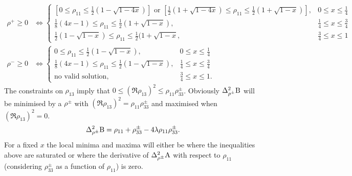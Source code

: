 \begin{align}
  \label{eqn:rho-plus-constraints}
  \rho^+ \geq 0 &\iff \begin{cases}\left[ 0\leq \rho_{11}\leq\frac{1}{2}(1-\sqrt{1-4x})\right] \text{ or } \left[\frac{1}{2}(1+\sqrt{1-4x})\leq\rho_{11}\leq\frac{1}{2}(1+\sqrt{1-x})\right],  &0\leq x\leq\frac{1}{4}\\
    \frac{1}{8}\left(4x-1\right)\leq \rho_{11}\leq \frac{1}{2}\left(1+\sqrt{1-x}\right), & \frac{1}{4}\leq x\leq \frac{3}{4}\\
    \frac{1}{2}\left(1-\sqrt{1-x}\right)\leq \rho_{11} \leq\frac{1}{2}(1+\sqrt{1-x}, & \frac{3}{4}\leq x\leq 1
  \end{cases}\\ 
  \rho^- \geq 0 &\iff \begin{cases}0\leq\rho_{11}\leq\frac{1}{2}(1-\sqrt{1-x}), &0\leq x\leq\frac{1}{4}\\
    \frac{1}{8}\left(4x-1\right)\leq\rho_{11}\leq\frac{1}{2}(1-\sqrt{1-x}), & \frac{1}{4}\leq x\leq \frac{3}{4}\\
    \text{no valid solution}, & \frac{3}{4}\leq x\leq 1.
  \end{cases}\label{eqn:rho-minus-constraints}
\end{align} %
The constraints on $\rho_{13}$ imply that $0\leq\left(\Re{\rho_{13}}\right)^2\leq\rho_{11}\rho_{33}^\pm$. Obviously $\var[\rho^\pm]{\opb}$ will be minimised by a $\rho^\pm$ with $\left(\Re{\rho_{13}}\right)^2 = \rho_{11}\rho_{33}^\pm$ and maximised when $\left(\Re{\rho_{13}}\right)^2 = 0$.
\begin{align}
  \var[\rho^\pm]{\opb} = \rho_{11} +\rho_{33}^\pm - 4\lambda\rho_{11}\rho_{33}^\pm.
\end{align}
For a fixed $x$ the local minima and maxima will either be where the inequalities above are saturated or where the derivative of $\var[\rho^\pm]{\opa}$ with respect to $\rho_{11}$ (considering $\rho_{33}^\pm$ as a function of $\rho_{11}$) is zero. 

